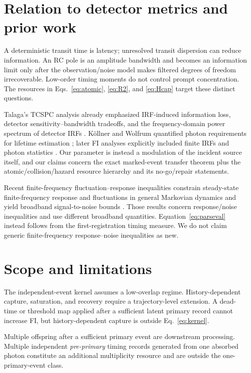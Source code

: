 \documentclass[aps,prapplied,preprint,nofootinbib]{revtex4-2}
\begin{document}
\section{Relation to detector metrics and prior work}

A deterministic transit time is latency; unresolved transit dispersion can reduce information. An RC pole is an amplitude bandwidth and becomes an information limit only after the observation/noise model makes filtered degrees of freedom irrecoverable. Low-order timing moments do not control prompt concentration. The resources in Eqs.~\eqref{eq:atomic}, \eqref{eq:R2}, and \eqref{eq:Hcap} target these distinct questions.

Talaga's TCSPC analysis already emphasized IRF-induced information loss, detector sensitivity--bandwidth tradeoffs, and the frequency-domain power spectrum of detector IRFs \cite{Talaga2009}. K\"ollner and Wolfrum quantified photon requirements for lifetime estimation \cite{KollnerWolfrum1992}; later FI analyses explicitly included finite IRFs and photon statistics \cite{Bouchet2019,TrinhEsposito2021}. Our parameter is instead a modulation of the incident source itself, and our claims concern the exact marked-event transfer theorem plus the atomic/collision/hazard resource hierarchy and its no-go/repair statements.

Recent finite-frequency fluctuation--response inequalities constrain steady-state finite-frequency response and fluctuations in general Markovian dynamics and yield broadband signal-to-noise bounds \cite{Dechant2026}. Those results concern response/noise inequalities and use different broadband quantities. Equation~\eqref{eq:parseval} instead follows from the first-registration timing measure. We do not claim generic finite-frequency response--noise inequalities as new.

\section{Scope and limitations}

The independent-event kernel assumes a low-overlap regime. History-dependent capture, saturation, and recovery require a trajectory-level extension. A dead-time or threshold map applied after a sufficient latent primary record cannot increase FI, but history-dependent capture is outside Eq.~\eqref{eq:kernel}.

Multiple offspring after a sufficient primary event are downstream processing. Multiple independent \emph{pre-primary} timing records generated from one absorbed photon constitute an additional multiplicity resource and are outside the one-primary-event class.
\end{document}
